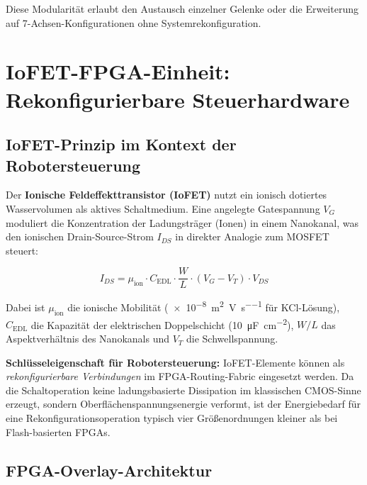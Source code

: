﻿\documentclass[a4paper,12pt]{scrreprt}
\theoremstyle{definition}
\begin{document}
Diese Modularität erlaubt den Austausch einzelner Gelenke oder die
Erweiterung auf 7-Achsen-Konfigurationen ohne Systemrekonfiguration.

\section{IoFET-FPGA-Einheit: Rekonfigurierbare Steuerhardware}

\subsection{IoFET-Prinzip im Kontext der Robotersteuerung}

Der \textbf{Ionische Feldeffekttransistor (IoFET)} nutzt ein ionisch
dotiertes Wasservolumen als aktives Schaltmedium. Eine angelegte
Gatespannung $V_G$ moduliert die Konzentration der Ladungsträger
(Ionen) in einem Nanokanal, was den ionischen Drain-Source-Strom $I_{DS}$
in direkter Analogie zum MOSFET steuert:

\begin{equation}
  I_{DS} = \mu_{\text{ion}} \cdot C_{\text{EDL}} \cdot
  \frac{W}{L} \cdot (V_G - V_T) \cdot V_{DS}
\end{equation}

Dabei ist $\mu_{\text{ion}}$ die ionische Mobilität (\SI{e-8}{\meter\squared\per\volt\per\second}
für KCl-Lösung), $C_{\text{EDL}}$ die Kapazität der elektrischen
Doppelschicht (\SI{10}{\micro\farad\per\centi\meter\squared}),
$W/L$ das Aspektverhältnis des Nanokanals und $V_T$ die Schwellspannung.

\begin{infobox}
\textbf{Schlüsseleigenschaft für Robotersteuerung:}
IoFET-Elemente können als \emph{rekonfigurierbare Verbindungen}
im FPGA-Routing-Fabric eingesetzt werden. Da die Schaltoperation
keine ladungsbasierte Dissipation im klassischen CMOS-Sinne erzeugt,
sondern Oberflächenspannungsenergie verformt, ist der Energiebedarf
für eine Rekonfigurationsoperation typisch vier Größenordnungen
kleiner als bei Flash-basierten FPGAs.
\end{infobox}

\subsection{FPGA-Overlay-Architektur}
\end{document}
